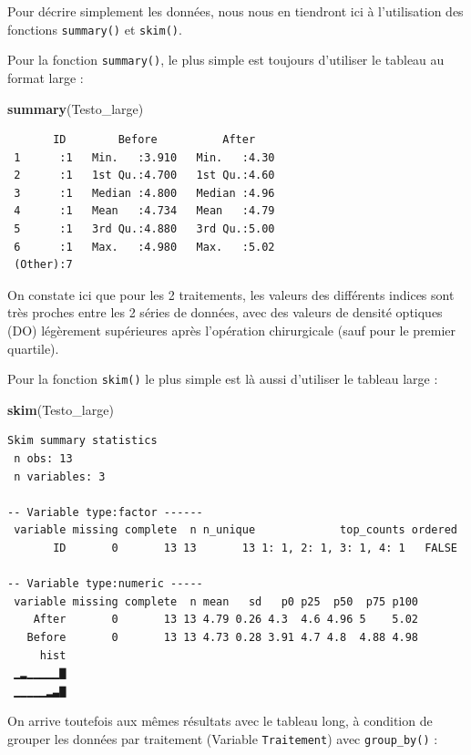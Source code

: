 \documentclass[a4paperpaper,]{article}
\newenvironment{Shaded}{\begin{snugshade}}{\end{snugshade}}
\newcommand{\KeywordTok}[1]{\textcolor[rgb]{0.12,0.11,0.11}{\textbf{#1}}}
\newcommand{\NormalTok}[1]{\textcolor[rgb]{0.12,0.11,0.11}{#1}}
\begin{document}
Pour décrire simplement les données, nous nous en tiendront ici à l'utilisation des fonctions \texttt{summary()} et \texttt{skim()}.

Pour la fonction \texttt{summary()}, le plus simple est toujours d'utiliser le tableau au format large :

\begin{Shaded}
\begin{Highlighting}[]
\KeywordTok{summary}\NormalTok{(Testo_large)}
\end{Highlighting}
\end{Shaded}

\begin{verbatim}
       ID        Before          After     
 1      :1   Min.   :3.910   Min.   :4.30  
 2      :1   1st Qu.:4.700   1st Qu.:4.60  
 3      :1   Median :4.800   Median :4.96  
 4      :1   Mean   :4.734   Mean   :4.79  
 5      :1   3rd Qu.:4.880   3rd Qu.:5.00  
 6      :1   Max.   :4.980   Max.   :5.02  
 (Other):7                                 
\end{verbatim}

On constate ici que pour les 2 traitements, les valeurs des différents indices sont très proches entre les 2 séries de données, avec des valeurs de densité optiques (DO) légèrement supérieures après l'opération chirurgicale (sauf pour le premier quartile).

Pour la fonction \texttt{skim()} le plus simple est là aussi d'utiliser le tableau large :

\begin{Shaded}
\begin{Highlighting}[]
\KeywordTok{skim}\NormalTok{(Testo_large)}
\end{Highlighting}
\end{Shaded}

\begin{verbatim}
Skim summary statistics
 n obs: 13 
 n variables: 3 

-- Variable type:factor ------
 variable missing complete  n n_unique             top_counts ordered
       ID       0       13 13       13 1: 1, 2: 1, 3: 1, 4: 1   FALSE

-- Variable type:numeric -----
 variable missing complete  n mean   sd   p0 p25  p50  p75 p100
    After       0       13 13 4.79 0.26 4.3  4.6 4.96 5    5.02
   Before       0       13 13 4.73 0.28 3.91 4.7 4.8  4.88 4.98
     hist
 ▁▂▁▁▁▁▁▇
 ▁▁▁▁▁▂▃▇
\end{verbatim}

On arrive toutefois aux mêmes résultats avec le tableau long, à condition de grouper les données par traitement (Variable \texttt{Traitement}) avec \texttt{group\_by()} :
\end{document}

